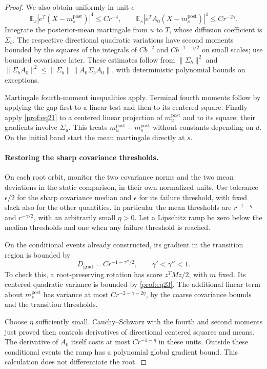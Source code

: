 \begin{proof}
We also obtain uniformly in unit \(e\)
\[
 \mathbb E_s|e^T(X-m_s^{\mathrm{post}})|^4\le Cr^{-4},\qquad
 \mathbb E_s|e^TA_0(X-m_s^{\mathrm{post}})|^4\le Cr^{-2\gamma}.
\]
Integrate the posterior-mean martingale from \(u\) to \(T\), whose
diffusion coefficient is \(\Sigma_b\).  The respective directional
quadratic variations have second moments bounded by the squares of
the integrals of \(Cb^{-2}\) and \(Cb^{-1-\gamma/2}\) on small
scales; use bounded covariance later.  These estimates follow from
\(\|\Sigma_b\|^2\) and
\(\|\Sigma_bA_0\|^2\le
\|\Sigma_b\|\|A_0\Sigma_bA_0\|\), with deterministic polynomial
bounds on exceptions.

Martingale fourth-moment inequalities apply.
Terminal fourth moments follow by applying the gap first to a linear
test and then to its centered square.  Finally apply
\eqref{prof:eq21} to a centered linear projection of
\(m_u^{\mathrm{post}}\) and to its square; their gradients involve
\(\Sigma_u\).  This treats
\(m_u^{\mathrm{post}}-m_s^{\mathrm{post}}\) without constants
depending on \(d\).  On the initial band start the mean martingale
directly at \(s\).

\paragraph{Restoring the sharp covariance thresholds.}
On each root orbit, monitor the two covariance norms and the two mean
deviations in the static comparison, in their own normalized units.
Use tolerance \(\epsilon/2\) for the sharp covariance median and
\(\epsilon\) for its failure threshold, with fixed slack also for
the other quantities.  In particular the mean thresholds are
\(r^{-1-\eta}\) and \(r^{-\gamma/2}\), with an arbitrarily small
\(\eta>0\).  Let a Lipschitz ramp be zero below the median thresholds
and one when any failure threshold is reached.

On the conditional
events already constructed, its gradient in the transition region is
bounded by
\[
 D_{\mathrm{grad}}=Cr^{-1-\gamma''/2},\qquad
                     \gamma'<\gamma''<1.
\]
To check this, a root-preserving rotation has score \(z^TMz/2\), with
\(m\) fixed.  Its centered quadratic variance is bounded by
\eqref{prof:eq23}.  The additional linear term about
\(m_s^{\mathrm{post}}\) has variance at most
\(Cr^{-2-\gamma-2\eta}\), by the coarse covariance bounds and the
transition thresholds.

Choose \(\eta\) sufficiently small.
Cauchy--Schwarz with the fourth and second moments just proved then
controls derivatives of directional centered squares and means.
The derivative of \(A_0\) itself costs at most
\(Cr^{-1-\eta}\) in these units.  Outside these conditional events
the ramp has a polynomial global gradient bound.  This calculation
does not differentiate the root.


\end{proof}
